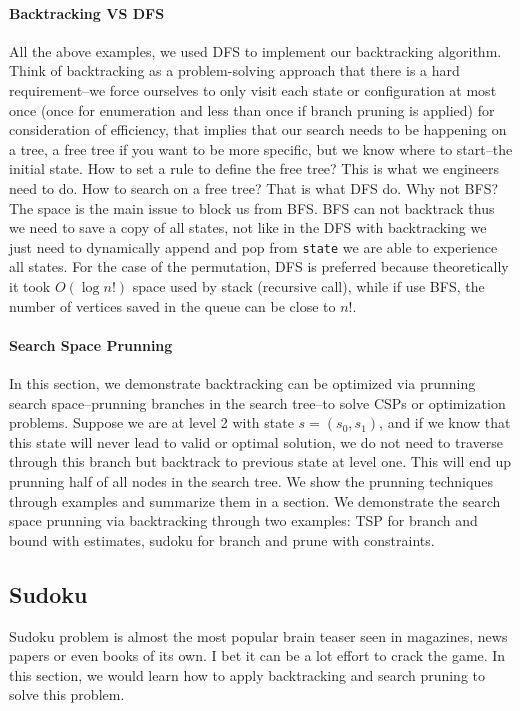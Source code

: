 \documentclass[../main.tex]{subfiles}
\begin{document}
\paragraph{Backtracking VS DFS} All the above examples, we used DFS to implement our backtracking algorithm. Think of backtracking as a problem-solving approach that there is a hard requirement--we force ourselves to only visit each state or configuration at most once (once for enumeration and less than once if branch pruning is applied) for consideration of efficiency, that implies that our search needs to be happening on a tree, a free tree if you want to be more specific, but we know where to start--the initial state. How to set a rule to define the free tree? This is what we engineers need to do. How to search on a free tree? That is what DFS do. Why not BFS? The space is the main issue to block us from BFS. BFS can not backtrack thus we need to save a copy of all states, not like in the DFS with backtracking we just need to dynamically append and pop from \texttt{state} we are able to experience all states.  For the case of the permutation, DFS is preferred because theoretically it took $O(\log n!)$ space used by stack (recursive call), while if use BFS, the number of vertices saved in the queue can be close to $n!$. 


\paragraph{Search Space Prunning}  In this section, we demonstrate  backtracking can be optimized via prunning search space--prunning branches in the search tree--to solve CSPs or optimization problems. Suppose we are at level 2 with state $s=(s_0, s_1)$, and if we know that this state will never lead to valid or optimal solution, we do not need to traverse through this branch but backtrack to previous state at level one. This will end up prunning half of all nodes in the search tree. We show the prunning techniques through examples and summarize them in a section.  We demonstrate the search space prunning via backtracking through two examples: TSP for branch and bound with estimates, sudoku for branch and prune with constraints.   




\subsection{Sudoku}
Sudoku problem is almost the most popular brain teaser seen in magazines, news papers or even books of its own. I bet it can be a lot effort to crack the game. In this section, we would learn how to apply backtracking and search pruning to solve this problem.
\end{document}
